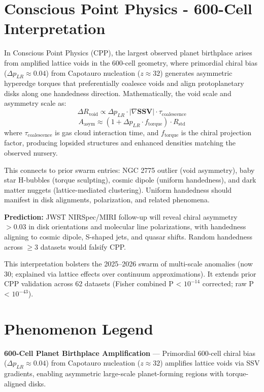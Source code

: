 \documentclass[11pt]{article}
\begin{document}
\section{Conscious Point Physics - 600-Cell Interpretation}
In Conscious Point Physics (CPP), the largest observed planet birthplace arises from amplified lattice voids in the 600-cell geometry, where primordial chiral bias ($\Delta p_{LR} \approx 0.04$) from Capotauro nucleation ($z \approx 32$) generates asymmetric hyperedge torques that preferentially coalesce voids and align protoplanetary disks along one handedness direction.  
Mathematically, the void scale and asymmetry scale as:  
\[
\Delta R_{\text{void}} \propto \Delta p_{LR} \cdot |\nabla \mathbf{SSV}| \cdot \tau_{\text{coalescence}}
\]
\[
A_{\text{asym}} \approx (1 + \Delta p_{LR} \cdot f_{\text{torque}}) \cdot R_{\text{std}}
\]
where $\tau_{\text{coalescence}}$ is gas cloud interaction time, and $f_{\text{torque}}$ is the chiral projection factor, producing lopsided structures and enhanced densities matching the observed nursery.  

This connects to prior swarm entries: NGC 2775 outlier (void asymmetry), baby star H-bubbles (torque sculpting), cosmic dipole (uniform handedness), and dark matter nuggets (lattice-mediated clustering). Uniform handedness should manifest in disk alignments, polarization, and related phenomena.

\textbf{Prediction:} JWST NIRSpec/MIRI follow-up will reveal chiral asymmetry $>0.03$ in disk orientations and molecular line polarizations, with handedness aligning to cosmic dipole, S-shaped jets, and quasar shifts. Random handedness across $\geq 3$ datasets would falsify CPP.  

This interpretation bolsters the 2025--2026 swarm of multi-scale anomalies (now 30; explained via lattice effects over continuum approximations). It extends prior CPP validation across 62 datasets (Fisher combined P < $10^{-14}$ corrected; raw P < $10^{-43}$).

\section{Phenomenon Legend}
\textbf{600-Cell Planet Birthplace Amplification} — Primordial 600-cell chiral bias ($\Delta p_{LR} \approx 0.04$) from Capotauro nucleation ($z \approx 32$) amplifies lattice voids via SSV gradients, enabling asymmetric large-scale planet-forming regions with torque-aligned disks.
\end{document}
